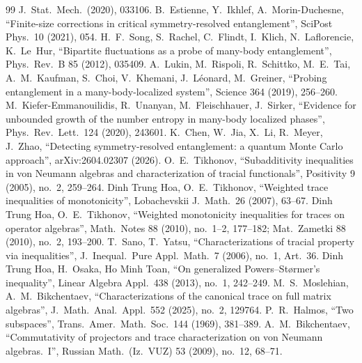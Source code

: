 \documentclass[11pt]{article}
\begin{document}
{\begin{thebibliography}{99}
  J.\ Stat.\ Mech.\ (2020), 033106.
 B.~Estienne, Y.~Ikhlef, A.~Morin-Duchesne, ``Finite-size corrections in critical
  symmetry-resolved entanglement'', SciPost Phys.\ 10 (2021), 054.
 H.~F.~Song, S.~Rachel, C.~Flindt, I.~Klich, N.~Laflorencie, K.~Le~Hur, ``Bipartite fluctuations as
  a probe of many-body entanglement'', Phys.\ Rev.\ B 85 (2012), 035409.
 A.~Lukin, M.~Rispoli, R.~Schittko, M.~E.~Tai, A.~M.~Kaufman, S.~Choi, V.~Khemani, J.~L\'eonard,
  M.~Greiner, ``Probing entanglement in a many-body-localized system'', Science 364 (2019), 256--260.
 M.~Kiefer-Emmanouilidis, R.~Unanyan, M.~Fleischhauer, J.~Sirker, ``Evidence for unbounded growth
  of the number entropy in many-body localized phases'', Phys.\ Rev.\ Lett.\ 124 (2020), 243601.
 K.~Chen, W.~Jia, X.~Li, R.~Meyer, J.~Zhao, ``Detecting symmetry-resolved entanglement: a quantum
  Monte Carlo approach'', arXiv:2604.02307 (2026).
 O.~E.~Tikhonov, ``Subadditivity inequalities in von Neumann algebras and characterization of
  tracial functionals'', Positivity 9 (2005), no.~2, 259--264.
 Dinh Trung Hoa, O.~E.~Tikhonov, ``Weighted trace inequalities of monotonicity'', Lobachevskii J.\
  Math.\ 26 (2007), 63--67.
 Dinh Trung Hoa, O.~E.~Tikhonov, ``Weighted monotonicity inequalities for traces on operator
  algebras'', Math.\ Notes 88 (2010), no.~1--2, 177--182; Mat.\ Zametki 88 (2010), no.~2, 193--200.
\bibitem{sano2006} T.~Sano, T.~Yatsu, ``Characterizations of tracial property via inequalities'', J.\ Inequal.\ Pure
  Appl.\ Math.\ 7 (2006), no.~1, Art.~36.
 Dinh Trung Hoa, H.~Osaka, Ho Minh Toan, ``On generalized Powers--St{\o}rmer's inequality'', Linear
  Algebra Appl.\ 438 (2013), no.~1, 242--249.
 M.~S.~Moslehian, A.~M.~Bikchentaev, ``Characterizations of the canonical trace on full
  matrix algebras'', J.\ Math.\ Anal.\ Appl.\ 552 (2025), no.~2, 129764.
\bibitem{halmos1969} P.~R.~Halmos, ``Two subspaces'', Trans.\ Amer.\ Math.\ Soc.\ 144 (1969), 381--389.
\bibitem{bikchentaev2009rm} A.~M.~Bikchentaev, ``Commutativity of projectors and trace characterization on von Neumann
  algebras.~I'', Russian Math.\ (Iz.\ VUZ) 53 (2009), no.~12, 68--71.
\end{thebibliography}
}
\end{document}
